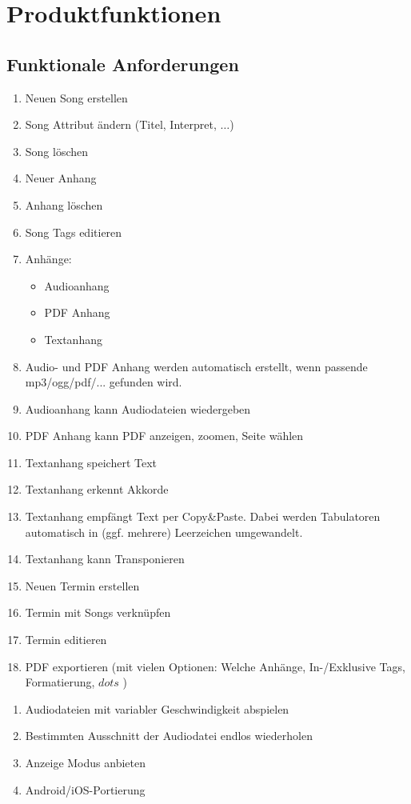 
\section{Produktfunktionen}

\subsection{Funktionale Anforderungen}
\begin{enumerate}[{/FA}1{/}]
\item Neuen Song erstellen
\item Song Attribut ändern (Titel, Interpret, $\dots$)
\item Song löschen
\item Neuer Anhang
\item Anhang löschen
\item Song Tags editieren
\item Anhänge:
\begin{itemize}
	\item Audioanhang
	\item PDF Anhang
	\item Textanhang
\end{itemize}
\item Audio- und PDF Anhang werden automatisch erstellt, wenn passende mp3/ogg/pdf/... gefunden wird.
\item Audioanhang kann Audiodateien wiedergeben
\item PDF Anhang kann PDF anzeigen, zoomen, Seite wählen
\item Textanhang speichert Text
\item Textanhang erkennt Akkorde
\item Textanhang empfängt Text per Copy\&Paste. Dabei werden Tabulatoren automatisch in (ggf. mehrere) Leerzeichen umgewandelt.
\item Textanhang kann Transponieren
\item Neuen Termin erstellen
\item Termin mit Songs verknüpfen
\item Termin editieren
\item PDF exportieren (mit vielen Optionen: Welche Anhänge, In-/Exklusive Tags, Formatierung, $dots$ )
\end{enumerate}

\begin{enumerate}[{/WA}1{/}]
\item Audiodateien mit variabler Geschwindigkeit abspielen
\item Bestimmten Ausschnitt der Audiodatei endlos wiederholen
\item Anzeige Modus anbieten
\item Android/iOS-Portierung
\end{enumerate}


